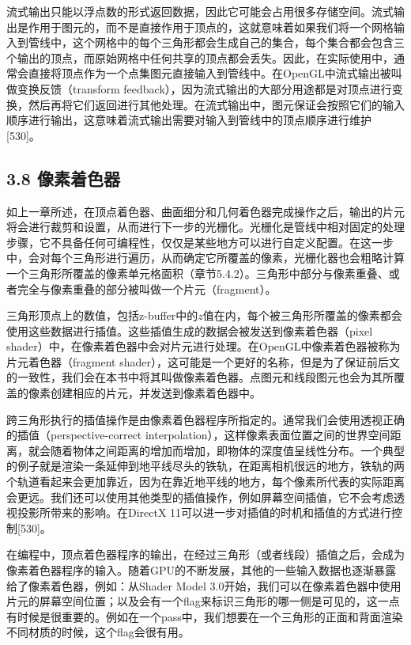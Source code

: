 \documentclass[
  paper=a4,
  ,captions=tableheading
]{scrartcl}
\begin{document}
流式输出只能以浮点数的形式返回数据，因此它可能会占用很多存储空间。流式输出是作用于图元的，而不是直接作用于顶点的，这就意味着如果我们将一个网格输入到管线中，这个网格中的每个三角形都会生成自己的集合，每个集合都会包含三个输出的顶点，而原始网格中任何共享的顶点都会丢失。因此，在实际使用中，通常会直接将顶点作为一个点集图元直接输入到管线中。在OpenGL中流式输出被叫做变换反馈（transform
feedback），因为流式输出的大部分用途都是对顶点进行变换，然后再将它们返回进行其他处理。在流式输出中，图元保证会按照它们的输入顺序进行输出，这意味着流式输出需要对输入到管线中的顶点顺序进行维护{[}530{]}。

\subsection{3.8 像素着色器}\label{ux50cfux7d20ux7740ux8272ux5668}

如上一章所述，在顶点着色器、曲面细分和几何着色器完成操作之后，输出的片元将会进行裁剪和设置，从而进行下一步的光栅化。光栅化是管线中相对固定的处理步骤，它不具备任何可编程性，仅仅是某些地方可以进行自定义配置。在这一步中，会对每个三角形进行遍历，从而确定它所覆盖的像素，光栅化器也会粗略计算一个三角形所覆盖的像素单元格面积（章节5.4.2）。三角形中部分与像素重叠、或者完全与像素重叠的部分被叫做一个片元（fragment）。

三角形顶点上的数值，包括z-buffer中的\(z\)值在内，每个被三角形所覆盖的像素都会使用这些数据进行插值。这些插值生成的数据会被发送到像素着色器（pixel
shader）中，在像素着色器中会对片元进行处理。在OpenGL中像素着色器被称为片元着色器（fragment
shader），这可能是一个更好的名称，但是为了保证前后文的一致性，我们会在本书中将其叫做像素着色器。点图元和线段图元也会为其所覆盖的像素创建相应的片元，并发送到像素着色器中。

跨三角形执行的插值操作是由像素着色器程序所指定的。通常我们会使用透视正确的插值（perspective-correct
interpolation），这样像素表面位置之间的世界空间距离，就会随着物体之间距离的增加而增加，即物体的深度值呈线性分布。一个典型的例子就是渲染一条延伸到地平线尽头的铁轨，在距离相机很远的地方，铁轨的两个轨道看起来会更加靠近，因为在靠近地平线的地方，每个像素所代表的实际距离会更远。我们还可以使用其他类型的插值操作，例如屏幕空间插值，它不会考虑透视投影所带来的影响。在DirectX
11可以进一步对插值的时机和插值的方式进行控制{[}530{]}。

在编程中，顶点着色器程序的输出，在经过三角形（或者线段）插值之后，会成为像素着色器程序的输入。随着GPU的不断发展，其他的一些输入数据也逐渐暴露给了像素着色器，例如：从Shader
Model
3.0开始，我们可以在像素着色器中使用片元的屏幕空间位置；以及会有一个flag来标识三角形的哪一侧是可见的，这一点有时候是很重要的。例如在一个pass中，我们想要在一个三角形的正面和背面渲染不同材质的时候，这个flag会很有用。
\end{document}
